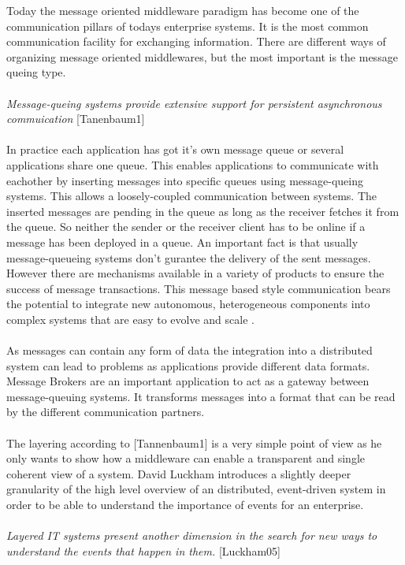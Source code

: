 \documentclass[a4paper,titlepage,11pt,DIV10,BCOR0.5cm,headinclude]{article}
\begin{document}
Today the message oriented middleware paradigm has become one of the communication pillars of todays enterprise systems. It is the most common communication facility for exchanging information. There are different ways of organizing message oriented middlewares, but the most important is the message queing type. 
\\\\
\textit{Message-queing systems provide extensive support for persistent asynchronous commuication} [Tanenbaum1]
\\\\
In practice each application has got it's own message queue or several applications share one queue. This enables applications to communicate with eachother by inserting messages into specific queues using message-queing systems. This allows a loosely-coupled communication between systems. The inserted messages are pending in the queue as long as the receiver fetches it from the queue. So neither the sender or the receiver client has to be online if a message has been deployed in a queue. An important fact is that usually message-queueing systems don't gurantee the delivery of the sent messages. However there are mechanisms available in a variety of products to ensure the success of message transactions. This message based style communication bears the potential to integrate new autonomous, heterogeneous components into complex systems that are easy to evolve and scale \cite{LudgerFiege05}.
\\\\
As messages can contain any form of data the integration into a distributed system can lead to problems as applications provide different data formats. Message Brokers are an important application to act as a gateway between message-queuing systems. It transforms messages into a format that can be read by the different communication partners.
\\\\
The layering according to [Tannenbaum1] is a very simple point of view as he only wants to show how a middleware can enable a transparent and single coherent view of a system. David Luckham introduces a slightly deeper granularity of the high level overview of an distributed, event-driven system in order to be able to understand the importance of events for an enterprise.
\\\\
\textit{Layered IT systems present another dimension in the search for new ways to understand the events that happen in them.} [Luckham05]
\end{document}
